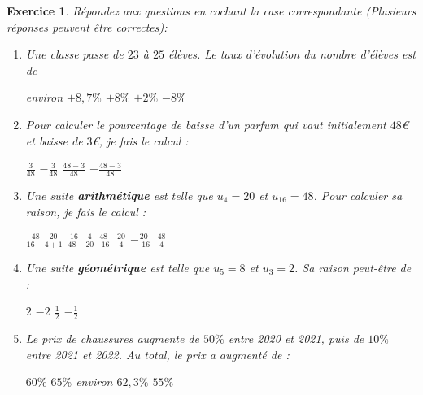 \documentclass[11pt,a4paper]{exam}
\newtheorem{exo}{Exercice}
\begin{document}
\vspace{8pt}

\begin{exo}
    Répondez aux questions en cochant la case correspondante (Plusieurs réponses peuvent être correctes): 
    \begin{enumerate}
        \item Une classe passe de $23$ à $25$ élèves. Le taux d'évolution du nombre d'élèves est de \newline
        \begin{oneparcheckboxes}
            \choice environ $+8{,}7\%$
            \choice $+8\%$
            \choice $+2\%$
            \choice $-8\%$
        \end{oneparcheckboxes}
        \item Pour calculer le pourcentage de baisse d'un parfum qui vaut initialement $48$€ et baisse de $3$€, je fais le calcul : \newline
        \begin{oneparcheckboxes}
            \choice $\frac{3}{48}$
            \choice $-\frac{3}{48}$
            \choice $\frac{48-3}{48}$
            \choice $-\frac{48-3}{48}$
        \end{oneparcheckboxes}
        \item Une suite \textbf{arithmétique} est telle que $u_4=20$ et $u_{16}=48$. Pour calculer sa raison, je fais le calcul : \newline
        \begin{oneparcheckboxes}
            \choice $\frac{48-20}{16-4+1}$
            \choice $\frac{16-4}{48-20}$
            \choice $\frac{48-20}{16-4}$
            \choice $-\frac{20-48}{16-4}$
        \end{oneparcheckboxes}
        \item Une suite \textbf{géométrique} est telle que $u_{5}=8$ et $u_3=2$. Sa raison peut-être de : \newline
        \begin{oneparcheckboxes}
            \choice $2$
            \choice $-2$
            \choice $\frac{1}{2}$
            \choice $-\frac{1}{2}$
        \end{oneparcheckboxes}
        \item Le prix de chaussures augmente de $50\%$ entre 2020 et 2021, puis de $10\%$ entre 2021 et 2022. Au total, le prix a augmenté de : \newline
        \begin{oneparcheckboxes}
            \choice $60\%$
            \choice $65\%$
            \choice environ $62{,}3\%$
            \choice $55\%$
        \end{oneparcheckboxes}
    \end{enumerate}
\end{exo}
\end{document}
